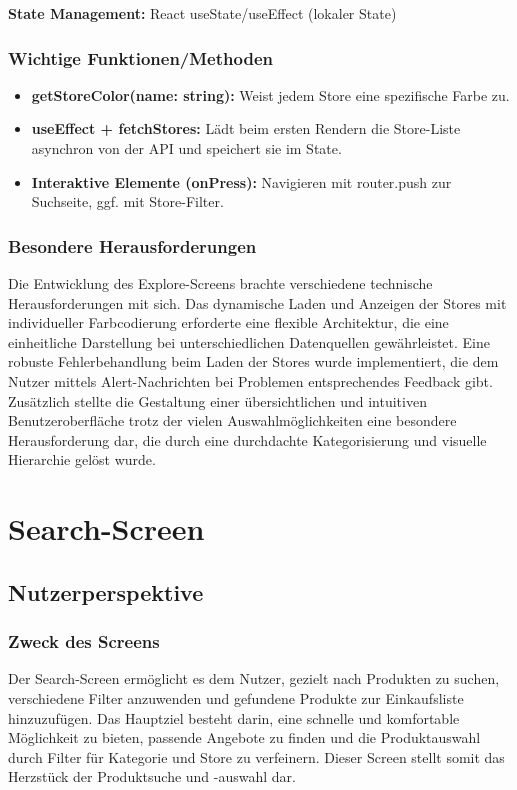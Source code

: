 \documentclass[12pt, a4paper]{report} %
\begin{document}
\noindent\textbf{State Management:} React useState/useEffect (lokaler State)

\subsubsection{Wichtige Funktionen/Methoden}

\begin{itemize}
    \item \textbf{getStoreColor(name: string):} Weist jedem Store eine spezifische Farbe zu.
    \item \textbf{useEffect + fetchStores:} Lädt beim ersten Rendern die Store-Liste asynchron von der API und speichert sie im State.
    \item \textbf{Interaktive Elemente (onPress):} Navigieren mit router.push zur Suchseite, ggf. mit Store-Filter.
\end{itemize}

\subsubsection{Besondere Herausforderungen}
Die Entwicklung des Explore-Screens brachte verschiedene technische Herausforderungen mit sich. Das dynamische Laden und Anzeigen der Stores mit individueller Farbcodierung erforderte eine flexible Architektur, die eine einheitliche Darstellung bei unterschiedlichen Datenquellen gewährleistet. Eine robuste Fehlerbehandlung beim Laden der Stores wurde implementiert, die dem Nutzer mittels Alert-Nachrichten bei Problemen entsprechendes Feedback gibt. Zusätzlich stellte die Gestaltung einer übersichtlichen und intuitiven Benutzeroberfläche trotz der vielen Auswahlmöglichkeiten eine besondere Herausforderung dar, die durch eine durchdachte Kategorisierung und visuelle Hierarchie gelöst wurde.

\section{Search-Screen}
\label{sec:search_screen}

\subsection{Nutzerperspektive}

\subsubsection{Zweck des Screens}
Der Search-Screen ermöglicht es dem Nutzer, gezielt nach Produkten zu suchen, verschiedene Filter anzuwenden und gefundene Produkte zur Einkaufsliste hinzuzufügen. Das Hauptziel besteht darin, eine schnelle und komfortable Möglichkeit zu bieten, passende Angebote zu finden und die Produktauswahl durch Filter für Kategorie und Store zu verfeinern. Dieser Screen stellt somit das Herzstück der Produktsuche und -auswahl dar.
\end{document}
